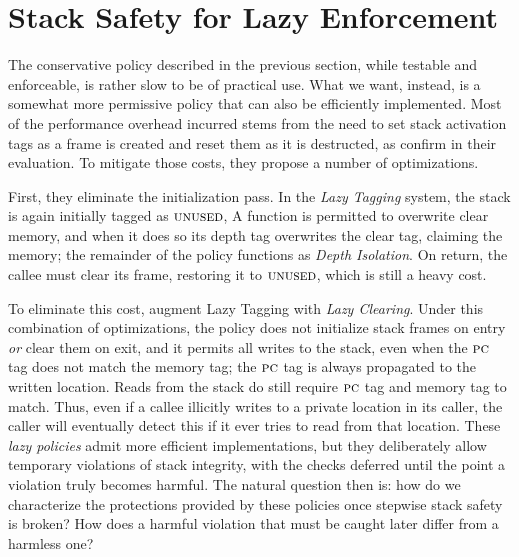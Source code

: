 \documentclass[acmsmall,review,anonymous]{acmart}\settopmatter{printfolios=true,printccs=false,printacmref=false}
\begin{document}
{\section{Stack Safety for Lazy Enforcement}
\label{sec:lazy}

The conservative policy described in the previous section, while
testable and enforceable, is rather slow to be of practical use. What
we want, instead, is a somewhat more permissive policy that can also
be efficiently implemented. Most of the performance overhead incurred
stems from the need to set stack activation tags as a frame is created
and reset them as it is destructed, as
\citet{DBLP:conf/sp/RoesslerD18} confirm in their evaluation. To
mitigate those costs, they propose a number of optimizations.

First, they eliminate the initialization pass. In the {\em Lazy Tagging}
system, the stack is again initially tagged as \(\textsc{unused}\),
A function is permitted
to overwrite clear memory, and when it does so its depth tag overwrites
the clear tag, claiming the memory; the remainder of the policy functions
as {\em Depth Isolation}. On return, the callee must clear its frame, restoring
it to \(\textsc{unused}\), which is still a heavy cost.

To eliminate this cost, \citet{DBLP:conf/sp/RoesslerD18} augment Lazy Tagging
with {\em Lazy Clearing}. Under this combination of optimizations,
the policy does not initialize stack frames on entry \emph{or} clear them on exit,
and it permits all writes to the stack, even when the $\textsc{pc}$ tag
does not match the memory tag; the \(\textsc{pc}\) tag is always propagated
to the written location. Reads from the stack do still require $\textsc{pc}$
tag and memory tag to match. Thus, even if a callee illicitly writes to
a private location in its caller, the caller will eventually detect this
if it ever tries to read from that location.
%
These \emph{lazy policies} admit more efficient implementations, but
they deliberately allow temporary violations of stack integrity,
with the checks deferred until the point a violation truly becomes
harmful. The natural question then is: how do we characterize the
protections provided by these policies once stepwise stack safety is broken?
How does a harmful violation that must be caught later differ from a
harmless one?

}
\end{document}
